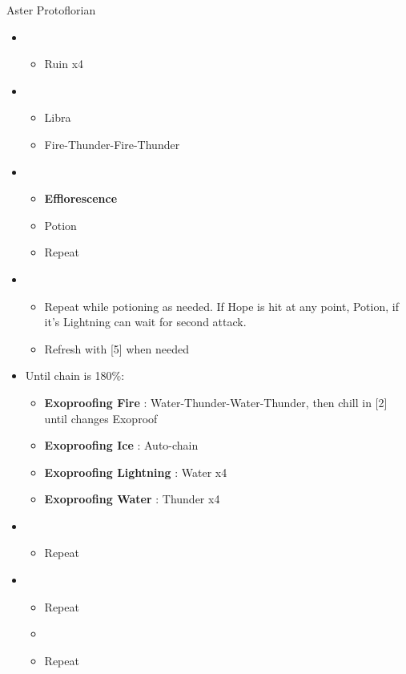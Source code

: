 \begin{battle}{Aster Protoflorian}
\begin{itemize}
    \item \first
    \begin{itemize}
        \item Ruin x4
    \end{itemize}
    \item \third
    \begin{itemize}
        \item Libra
        \item Fire-Thunder-Fire-Thunder
    \end{itemize}
    \item \first
    \begin{itemize}
        \item \textbf{Efflorescence}
        \item Potion
        \item Repeat
    \end{itemize}
    \item \fourth
    \begin{itemize}
        \item Repeat while potioning as needed. If Hope is hit at any point, Potion, if it's Lightning can wait for second attack.
        \item Refresh with [5] when needed
    \end{itemize}
    \item Until chain is 180\%:
    \begin{itemize}
        \item \textbf{Exoproofing Fire} : Water-Thunder-Water-Thunder, then chill in [2] until changes Exoproof
        \item \textbf{Exoproofing Ice} : Auto-chain
        \item \textbf{Exoproofing Lightning} : Water x4
        \item \textbf{Exoproofing Water} : Thunder x4
    \end{itemize}
    \item \second
    \begin{itemize}
        \item Repeat
    \end{itemize}
    \item \fourth
    \begin{itemize}
        \item Repeat
        \item \stagger
        \item Repeat

\end{itemize}
\end{itemize}
\end{battle}

